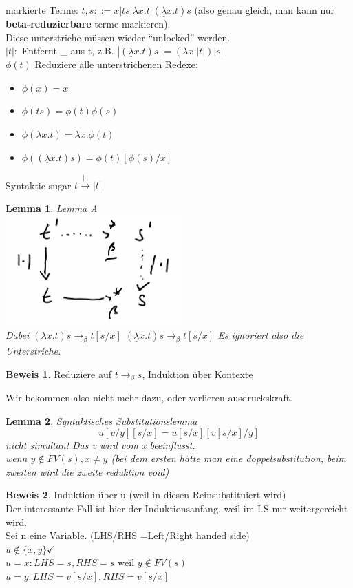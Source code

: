\documentclass{article}
\newtheorem{lemma}{Lemma}[section]
\theoremstyle{definition}
\newtheorem{beweis}{Beweis}[section]
\begin{document}
	markierte Terme: $t,s::=x|ts|\lambda x.t|(\underline{\lambda}x.t)s$ (also genau gleich, man kann nur \textbf{beta-reduzierbare }terme markieren).\\
	Diese unterstriche müssen wieder ``unlocked'' werden.\\
	$|t|:$ Entfernt \_ aus t, z.B. $|(\underline{\lambda}x.t)s|=(\lambda x.|t|) |s|$\\
	$\phi(t)$ Reduziere alle unterstrichenen Redexe:
	\begin{itemize}
	\item $\phi(x)=x$
	\item $\phi(ts)=\phi(t)\phi(s)$
	\item $\phi(\lambda x.t)=\lambda x.\phi(t)$
	\item $\phi((\underline{\lambda }x.t)s) = \phi(t)[\phi(s)/x]$
	\end{itemize}
	\newcommand{\tomark}{\stackrel{|\cdot|}{\to}}
	Syntaktic sugar $t\tomark |t|$
	\begin{lemma} Lemma A\\
	\includegraphics[width=256px]{images/LemmaA.png}\\
	Dabei $(\lambda x.t)s\to_{\underline{\beta}} t[s/x]$ $(\underline{\lambda} x.t)s\to_{\underline{\beta}} t[s/x]$ Es ignoriert also die Unterstriche.\\
	\end{lemma}
	\begin{beweis} Reduziere auf $t\to_\beta s$, Induktion über Kontexte
	\end{beweis}
	Wir bekommen also nicht mehr dazu, oder verlieren ausdruckskraft.
	\begin{lemma} Syntaktisches Substitutionslemma\\
	\[u[v/y][s/x] = u[s/x][v[s/x]/y]\]
	nicht simultan! Das v wird vom x beeinflusst.\\
	wenn $y\notin FV(s), x\neq y$ (bei dem ersten hätte man eine doppelsubstitution, beim zweiten wird die zweite reduktion void)\\
	\end{lemma}
	\begin{beweis} Induktion über u (weil in diesen Reinsubstituiert wird)\\
	Der interessante Fall ist hier der Induktionsanfang, weil im I.S nur weitergereicht wird.\\
	Sei n eine Variable. (LHS/RHS =Left/Right handed side)\\
	$u\notin \{x,y\}\checkmark$\\
	$u= x: LHS = s, RHS=s\text{ weil }y\notin FV(s)$\\
	$u= y:LHS = v[s/x], RHS=v[s/x]$\\
	\end{beweis}
\end{document}
